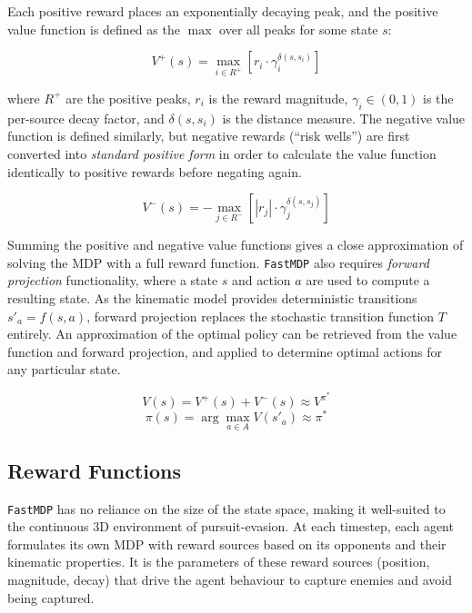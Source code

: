 Each positive reward places an exponentially decaying peak, and the positive value function is defined as the $\max$ over all peaks for some state $s$:

\begin{equation}
    V^+(s) = \max_{i \in R^+} \left[ r_i \cdot \gamma_i^{\delta(s, s_i)} \right]
\end{equation}

where $R^+$ are the positive peaks, $r_i$ is the reward magnitude, $\gamma_i \in (0,1)$ is the per-source decay factor, and $\delta(s, s_i)$ is the distance measure. The negative value function is defined similarly, but negative rewards (``risk wells'') are first converted into \textit{standard positive form} in order to calculate the value function identically to positive rewards before negating again.

\begin{equation}
V^-(s) = -\max_{j \in R^-} \left[ |r_j| \cdot \gamma_j^{\delta(s, s_j)} \right]
\end{equation}

Summing the positive and negative value functions gives a close approximation of solving the MDP with a full reward function\cite{bertram3d,bertram2d}. \texttt{FastMDP} also requires \textit{forward projection} functionality, where a state $s$ and action $a$ are used to compute a resulting state. As the kinematic model provides deterministic transitions $s'_a=f(s,a)$, forward projection replaces the stochastic transition function $T$ entirely. An approximation of the optimal policy can be retrieved from the value function and forward projection, and applied to determine optimal actions for any particular state.

\begin{equation}
V(s) = V^+(s) + V^-(s) \approx V^{\pi^*}
\end{equation} 
\begin{equation}
\pi(s) = \arg\max_{a \in A} V(s'_a) \approx \pi^*
\end{equation} 

\subsection{Reward Functions}
\label{sec:2.3.3}
\texttt{FastMDP} has no reliance on the size of the state space, making it well-suited to the continuous 3D environment of pursuit-evasion. At each timestep, each agent formulates its own MDP with reward sources based on its opponents and their kinematic properties. It is the parameters of these reward sources (position, magnitude, decay) that drive the agent behaviour to capture enemies and avoid being captured.

